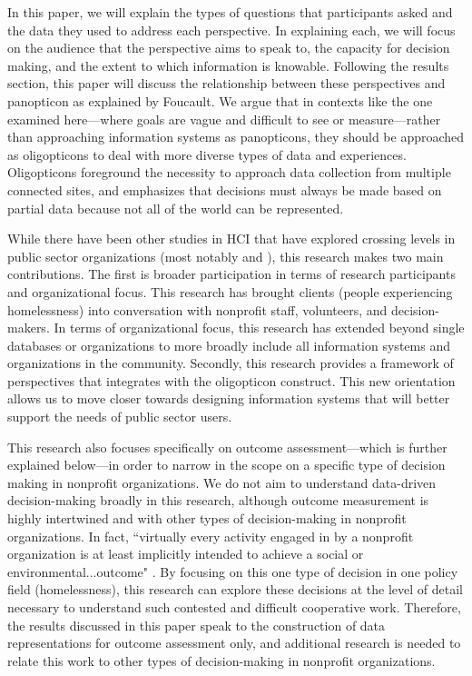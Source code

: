 In this paper, we will explain the types of questions that participants asked and the data they used to address each perspective. In explaining each, we will focus on the audience that the perspective aims to speak to, the capacity for decision making, and the extent to which information is knowable. Following the results section, this paper will discuss the relationship between these perspectives and panopticon as explained by Foucault. We argue that in contexts like the one examined here---where goals are vague and difficult to see or measure---rather than approaching information systems as panopticons, they should be approached as oligopticons to deal with more diverse types of data and experiences. Oligopticons foreground the necessity to approach data collection from multiple connected sites, and emphasizes that decisions must always be made based on partial data because not all of the world can be represented.

While there have been other studies in HCI that have explored crossing levels in public sector organizations (most notably \citet{LeDantec2010Boundaries} and \citet{Verma2016DrillDown}), this research makes two main contributions. The first is broader participation in terms of research participants and organizational focus. This research has brought clients (people experiencing homelessness) into conversation with nonprofit staff, volunteers, and decision-makers. In terms of organizational focus, this research has extended beyond single databases or organizations to more broadly include all information systems and organizations in the community. Secondly, this research provides a framework of perspectives that integrates with the oligopticon construct. This new orientation allows us to move closer towards designing information systems that will better support the needs of public sector users.

This research also focuses specifically on outcome assessment---which is further explained below---in order to narrow in the scope on a specific type of decision making in nonprofit organizations. We do not aim to understand data-driven decision-making broadly in this research, although outcome measurement is highly intertwined and with other types of decision-making in nonprofit organizations. In fact, ``virtually every activity engaged in by a nonprofit organization is at least implicitly intended to achieve a social or environmental...outcome" \citep{Brest2020Outcomes}. By focusing on this one type of decision in one policy field (homelessness), this research can explore these decisions at the level of detail necessary to understand such contested and difficult cooperative work. Therefore, the results discussed in this paper speak to the construction of data representations for outcome assessment only, and additional research is needed to relate this work to other types of decision-making in nonprofit organizations.

